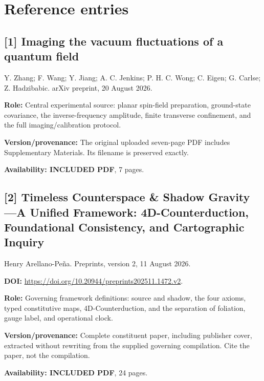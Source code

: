 \documentclass[11pt,a4paper]{article}
\begin{document}
\section*{Reference entries}
\begin{minipage}{\textwidth}
\subsection*{[1] Imaging the vacuum fluctuations of a quantum field}
Y. Zhang; F. Wang; Y. Jiang; A. C. Jenkins; P. H. C. Wong; C. Eigen; G. Carlse; Z. Hadzibabic. arXiv preprint, 20 August 2026.

\textbf{Role:} Central experimental source: planar spin-field preparation, ground-state covariance, the inverse-frequency amplitude, finite transverse confinement, and the full imaging/calibration protocol.

\textbf{Version/provenance:} The original uploaded seven-page PDF includes Supplementary Materials. Its filename is preserved exactly.

\textbf{Availability: INCLUDED PDF}, 7 pages.\par
{}
\end{minipage}
\par\medskip
\begin{minipage}{\textwidth}
\subsection*{[2] Timeless Counterspace \& Shadow Gravity---A Unified Framework: 4D-Counterduction, Foundational Consistency, and Cartographic Inquiry}
Henry Arellano-Pe\~na. Preprints, version 2, 11 August 2026.

\textbf{DOI:} \url{https://doi.org/10.20944/preprints202511.1472.v2}.

\textbf{Role:} Governing framework definitions: source and shadow, the four axioms, typed constitutive maps, 4D-Counterduction, and the separation of foliation, gauge label, and operational clock.

\textbf{Version/provenance:} Complete constituent paper, including publisher cover, extracted without rewriting from the supplied governing compilation. Cite the paper, not the compilation.

\textbf{Availability: INCLUDED PDF}, 24 pages.\par
{}
\end{minipage}
\end{document}

